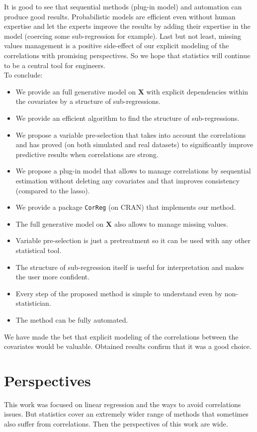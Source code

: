\documentclass[12pt,a4paper]{report}
\begin{document}
		It is good to see that sequential methods (plug-in model) and automation can produce good results. Probabilistic models are efficient even without human expertise and let the experts improve the results by adding their expertise in the model (coercing some sub-regression for example). Last but not least, missing values management is a positive side-effect of our explicit modeling of the correlations with promising perspectives.
		 So we hope that statistics will continue to be a central tool for engineers.\\
					
		To conclude:
		\begin{itemize}
			\item We provide an full generative model on $\boldsymbol{X}$ with explicit dependencies within the covariates by a structure of sub-regressions.
			\item We provide an efficient algorithm to find the structure of sub-regressions.
			\item We propose a variable pre-selection that takes into account the correlations and has proved (on both simulated and real datasets) to significantly improve predictive results when correlations are strong.
			\item We propose a plug-in model that allows to manage correlations by sequential estimation without deleting any covariates and that improves consistency (compared to the {\sc lasso}).
			\item We provide a package {\tt CorReg} (on CRAN) that implements our method.
			\item The full generative model on $\boldsymbol{X}$ also allows to manage missing values.
			\item Variable pre-selection is just a pretreatment so it can be used with any other statistical tool.
			\item The structure of sub-regression itself is useful for interpretation and makes the user more confident.
			\item Every step of the proposed method is simple to understand even by non-statistician.
			\item The method can be fully automated.
		\end{itemize}
		We have made the bet that explicit modeling of the correlations between the covariates would be valuable. Obtained results confirm that it was a good choice.		
		
	\section{Perspectives}
	This work was focused on linear regression and the ways to avoid correlations issues. But statistics cover an extremely wider range of methods that sometimes also suffer from correlations. Then the perspectives of this work are wide.
\end{document}
